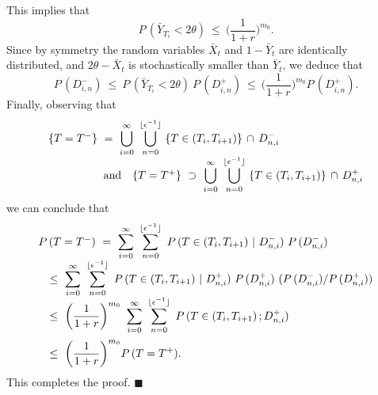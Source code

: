  This implies that
 $$ P \,(\bar Y_{T_i} < 2 \theta) \ \leq \ \bigg(\frac{1}{1 + r} \bigg)^{m_0}. $$
 Since by symmetry the random variables $\bar X_t$ and $1 - \bar Y_t$ are identically distributed, and $2 \theta - \bar X_t$ is
 stochastically smaller than $\bar Y_t$, we deduce that
 $$ P \,(D_{i, n}^-) \ \leq \ P \,(\bar Y_{T_i} < 2 \theta) \ P \,(D_{i, n}^+) \ \leq \
      \bigg(\frac{1}{1 + r} \bigg)^{m_0} P \,(D_{i, n}^+). $$
 Finally, observing that
 $$ \begin{array}{l}
    \{T = T^- \} \ = \ \displaystyle \bigcup_{i = 0}^{\infty} \
    \bigcup_{n = 0}^{\lfloor \epsilon^{-1} \rfloor} \ \{T \in (T_i, T_{i + 1}) \} \,\cap \,D_{n, i}^- \\ \hspace{50pt} \hbox{and} \quad
    \{T = T^+ \} \ \supset \ \displaystyle \bigcup_{i = 0}^{\infty} \
    \bigcup_{n = 0}^{\lfloor \epsilon^{-1} \rfloor} \ \{T \in (T_i, T_{i + 1}) \} \,\cap \,D_{n, i}^+ \end{array} $$
 we can conclude that
 $$ \begin{array}{l}
  P \,(T = T^-) \ = \
    \displaystyle \sum_{i = 0}^{\infty} \ \sum_{n = 0}^{\lfloor \epsilon^{-1} \rfloor} \
  P \,(T \in (T_i, T_{i + 1}) \ | \ D_{n, i}^-) \ P \,(D_{n, i}^-) \\ \hspace{10pt} \leq \
    \displaystyle \sum_{i = 0}^{\infty} \ \sum_{n = 0}^{\lfloor \epsilon^{-1} \rfloor} \
  P \,(T \in (T_i, T_{i + 1}) \ | \ D_{n, i}^+) \ P \,(D_{n, i}^+) \ (P \,(D_{n, i}^-) / P \,(D_{n, i}^+)) \\ \hspace{10pt} \leq \
    \displaystyle \bigg(\frac{1}{1 + r} \bigg)^{m_0} \
    \sum_{i = 0}^{\infty} \ \sum_{n = 0}^{\lfloor \epsilon^{-1} \rfloor} \ P \,(T \in (T_i, T_{i + 1}) \,; D_{n, i}^+) \vspace{6pt} \\ \hspace{10pt} \leq \
    \displaystyle \bigg(\frac{1}{1 + r} \bigg)^{m_0} P \,(T = T^+). \end{array} $$
 This completes the proof. \hspace{2mm} $\blacksquare$

